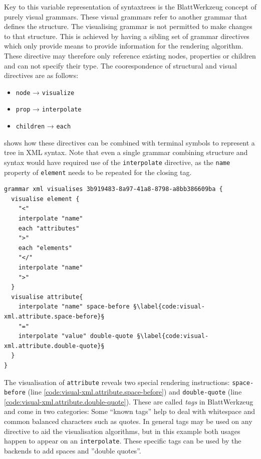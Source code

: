 \documentclass[]{report}
\begin{document}
Key to this variable representation of syntaxtrees is the Blatt\-Werkzeug concept of purely visual grammars. These visual grammars refer to another grammar that defines the structure. The visualising grammar is not permitted to make changes to that structure. This is achieved by having a sibling set of grammar directives which only provide means to provide information for the rendering algorithm. These directive may therefore only reference existing nodes, properties or children and can not specify their type. The coorespondence of structural and visual directives are as follows:

\begin{itemize}
  \item \texttt{node} → \texttt{visualize}
  \item \texttt{prop} → \texttt{interpolate}
  \item \texttt{children} → \texttt{each}
\end{itemize}

 shows how these directives can be combined with terminal symbols to represent a tree in XML syntax. Note that even a single grammar combining structure and syntax would have required use of the \texttt{interpolate} directive, as the \texttt{name} property of \texttt{element} needs to be repeated for the closing tag.

\begin{listing}[H]
\begin{verbatim}
grammar xml visualises 3b919483-8a97-41a8-8798-a8bb386609ba {
  visualise element {
    "<"
    interpolate "name"
    each "attributes"
    ">"
    each "elements"
    "</"
    interpolate "name"
    ">"
  }
  visualise attribute{
    interpolate "name" space-before §\label{code:visual-xml.attribute.space-before}§
    "="
    interpolate "value" double-quote §\label{code:visual-xml.attribute.double-quote}§
  }
}
\end{verbatim}
\caption{XML Visualisation: \texttt{element} and \texttt{attribute}}
\label{lst:xml-visualisation-no-containers}
\end{listing}

The visualisation of \texttt{attribute} reveals two special rendering instructions: \texttt{space-before} (line \ref{code:visual-xml.attribute.space-before}) and \texttt{double-quote} (line \ref{code:visual-xml.attribute.double-quote}). These are called \textit{tags} in Blatt\-Werkzeug and come in two categories: Some ``known tags'' help to deal with whitespace and common balanced characters such as quotes. In general tags may be used on any directive to aid the visualisation algorithms, but in this example both usages happen to appear on an \texttt{interpolate}. These specific tags can be used by the backends to add spaces and ''double quotes''.
\end{document}

